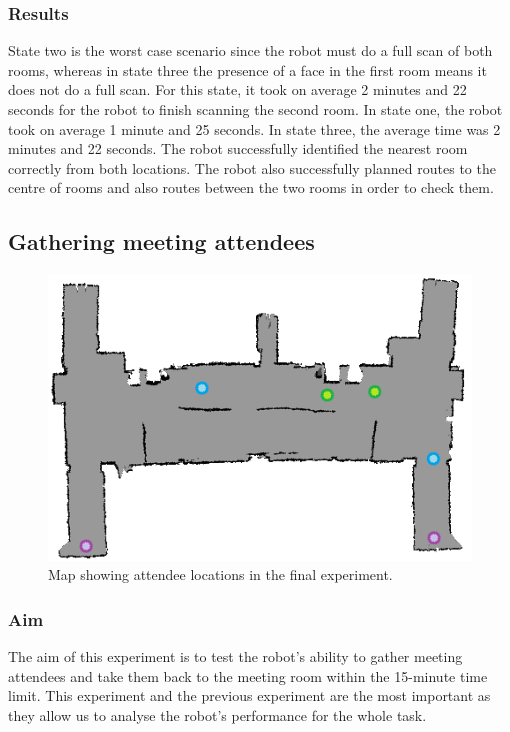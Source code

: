 \documentclass[conference]{IEEEtran}
\begin{document}
\subsubsection{Results}
State two is the worst case scenario since the robot must do a full scan of both rooms, whereas in state three the presence of a face in the first room means it does not do a full scan. For this state, it took on average 2 minutes and 22 seconds for the robot to finish scanning the second room. In state one, the robot took on average 1 minute and 25 seconds. In state three, the average time was 2 minutes and 22 seconds. The robot successfully identified the nearest room correctly from both locations. The robot also successfully planned routes to the centre of rooms and also routes between the two rooms in order to check them.
\subsection{Gathering meeting attendees}
\begin{figure}
  \includegraphics[width=\columnwidth]{explorationpeople}
  \caption{Map showing attendee locations in the final experiment.}
  \label{fig:attendees}
\end{figure}
\subsubsection{Aim}
The aim of this experiment is to test the robot's ability to gather meeting attendees and take them back to the meeting room within the 15-minute time limit. This experiment and the previous experiment are the most important as they allow us to analyse the robot's performance for the whole task.
\end{document}
